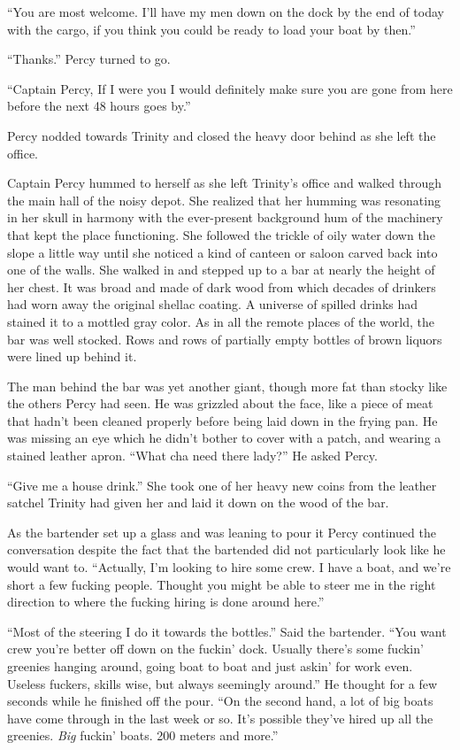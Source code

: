 \documentclass[]{scrbook}
\begin{document}
``You are most welcome. I'll have my men down on the dock by the end of
today with the cargo, if you think you could be ready to load your boat
by then.''

``Thanks.'' Percy turned to go.

``Captain Percy, If I were you I would definitely make sure you are gone
from here before the next 48 hours goes by.''

Percy nodded towards Trinity and closed the heavy door behind as she
left the office.

Captain Percy hummed to herself as she left Trinity's office and walked
through the main hall of the noisy depot. She realized that her humming
was resonating in her skull in harmony with the ever-present background
hum of the machinery that kept the place functioning. She followed the
trickle of oily water down the slope a little way until she noticed a
kind of canteen or saloon carved back into one of the walls. She walked
in and stepped up to a bar at nearly the height of her chest. It was
broad and made of dark wood from which decades of drinkers had worn away
the original shellac coating. A universe of spilled drinks had stained
it to a mottled gray color. As in all the remote places of the world,
the bar was well stocked. Rows and rows of partially empty bottles of
brown liquors were lined up behind it.

The man behind the bar was yet another giant, though more fat than
stocky like the others Percy had seen. He was grizzled about the face,
like a piece of meat that hadn't been cleaned properly before being laid
down in the frying pan. He was missing an eye which he didn't bother to
cover with a patch, and wearing a stained leather apron. ``What cha need
there lady?'' He asked Percy.

``Give me a house drink.'' She took one of her heavy new coins from the
leather satchel Trinity had given her and laid it down on the wood of
the bar.

As the bartender set up a glass and was leaning to pour it Percy
continued the conversation despite the fact that the bartended did not
particularly look like he would want to. ``Actually, I'm looking to hire
some crew. I have a boat, and we're short a few fucking people. Thought
you might be able to steer me in the right direction to where the
fucking hiring is done around here.''

``Most of the steering I do it towards the bottles.'' Said the
bartender. ``You want crew you're better off down on the fuckin' dock.
Usually there's some fuckin' greenies hanging around, going boat to boat
and just askin' for work even. Useless fuckers, skills wise, but always
seemingly around.'' He thought for a few seconds while he finished off
the pour. ``On the second hand, a lot of big boats have come through in
the last week or so. It's possible they've hired up all the greenies.
\emph{Big} fuckin' boats. 200 meters and more.''
\end{document}
